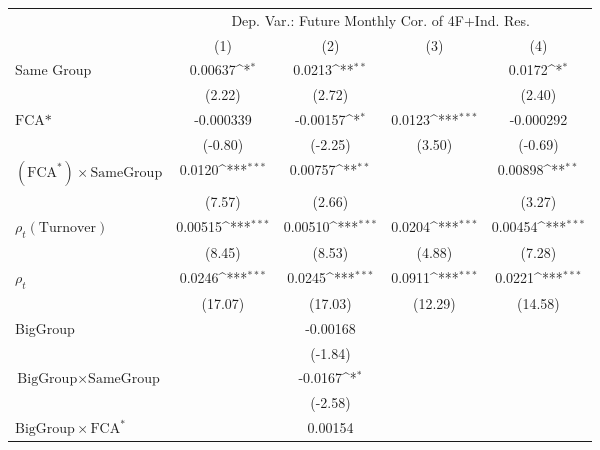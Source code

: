 {
\def\sym#1{\ifmmode^{#1}\else\(^{#1}\)\fi}
\begin{tabular}{l*{4}{c}}
\hline\hline
                &\multicolumn{4}{c}{Dep. Var.: Future Monthly Cor.  of 4F+Ind. Res.}        \\\cmidrule(lr){2-5}
                &\multicolumn{1}{c}{(1)}         &\multicolumn{1}{c}{(2)}         &\multicolumn{1}{c}{(3)}         &\multicolumn{1}{c}{(4)}         \\
\hline
Same Group      &  0.00637\sym{*}  &   0.0213\sym{**} &                  &   0.0172\sym{*}  \\
                &   (2.22)         &   (2.72)         &                  &   (2.40)         \\
[1em]
$ \text{FCA*} $ &-0.000339         & -0.00157\sym{*}  &   0.0123\sym{***}&-0.000292         \\
                &  (-0.80)         &  (-2.25)         &   (3.50)         &  (-0.69)         \\
[1em]
 $ (\text{FCA}^*) \times {\text{SameGroup} }  $ &   0.0120\sym{***}&  0.00757\sym{**} &                  &  0.00898\sym{**} \\
                &   (7.57)         &   (2.66)         &                  &   (3.27)         \\
[1em]
 $ {\rho_t(\text{Turnover})} $ &  0.00515\sym{***}&  0.00510\sym{***}&   0.0204\sym{***}&  0.00454\sym{***}\\
                &   (8.45)         &   (8.53)         &   (4.88)         &   (7.28)         \\
[1em]
 $ {\rho_t} $   &   0.0246\sym{***}&   0.0245\sym{***}&   0.0911\sym{***}&   0.0221\sym{***}\\
                &  (17.07)         &  (17.03)         &  (12.29)         &  (14.58)         \\
[1em]
BigGroup        &                  & -0.00168         &                  &                  \\
                &                  &  (-1.84)         &                  &                  \\
[1em]
$ {\text{BigGroup} } \times {\text{SameGroup} }  $ &                  &  -0.0167\sym{*}  &                  &                  \\
                &                  &  (-2.58)         &                  &                  \\
[1em]
$ {\text{BigGroup} } \times \text{FCA}^*  $ &                  &  0.00154         &                  &                  \\

\end{tabular}}
